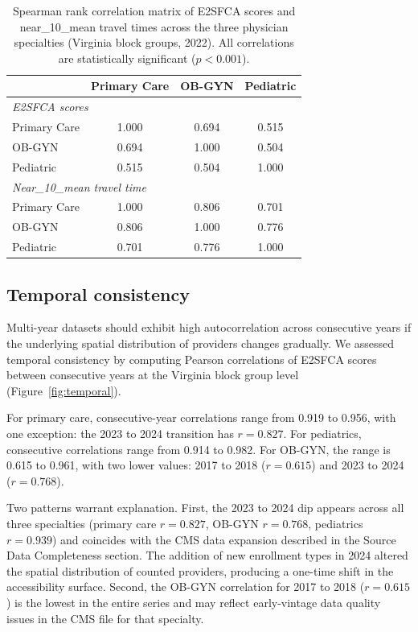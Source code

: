 \documentclass{CUP-JNL-DAP}%
\begin{document}
\begin{table}[ht]
\centering
\caption{Spearman rank correlation matrix of E2SFCA scores and near\_10\_mean travel times across the three physician specialties (Virginia block groups, 2022). All correlations are statistically significant ($p < 0.001$).}
\label{tab:correlation}
\small
\begin{tabular}{lccc}
\toprule
& Primary Care & OB-GYN & Pediatric \\
\midrule
\multicolumn{4}{l}{\textit{E2SFCA scores}} \\
Primary Care & 1.000 & 0.694 & 0.515 \\
OB-GYN & 0.694 & 1.000 & 0.504 \\
Pediatric & 0.515 & 0.504 & 1.000 \\
\midrule
\multicolumn{4}{l}{\textit{Near\_10\_mean travel time}} \\
Primary Care & 1.000 & 0.806 & 0.701 \\
OB-GYN & 0.806 & 1.000 & 0.776 \\
Pediatric & 0.701 & 0.776 & 1.000 \\
\bottomrule
\end{tabular}
\end{table}

\subsection{Temporal consistency}

Multi-year datasets should exhibit high autocorrelation across consecutive years if the underlying spatial distribution of providers changes gradually. We assessed temporal consistency by computing Pearson correlations of E2SFCA scores between consecutive years at the Virginia block group level (Figure~\ref{fig:temporal}).

For primary care, consecutive-year correlations range from 0.919 to 0.956, with one exception: the 2023 to 2024 transition has $r = 0.827$. For pediatrics, consecutive correlations range from 0.914 to 0.982. For OB-GYN, the range is 0.615 to 0.961, with two lower values: 2017 to 2018 ($r = 0.615$) and 2023 to 2024 ($r = 0.768$).

Two patterns warrant explanation. First, the 2023 to 2024 dip appears across all three specialties (primary care $r = 0.827$, OB-GYN $r = 0.768$, pediatrics $r = 0.939$) and coincides with the CMS data expansion described in the Source Data Completeness section. The addition of new enrollment types in 2024 altered the spatial distribution of counted providers, producing a one-time shift in the accessibility surface. Second, the OB-GYN correlation for 2017 to 2018 ($r = 0.615$) is the lowest in the entire series and may reflect early-vintage data quality issues in the CMS file for that specialty.
\end{document}
